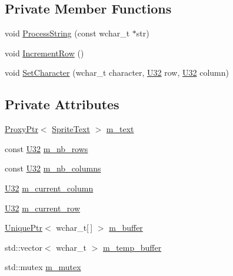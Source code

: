 \subsection*{Private Member Functions}
\begin{DoxyCompactItemize}
\item 
void \hyperlink{classmage_1_1script_1_1_text_console_script_a29334fd8aa8de09b2f28c24096347498}{Process\+String} (const wchar\+\_\+t $\ast$str)
\item 
void \hyperlink{classmage_1_1script_1_1_text_console_script_a3d4cba4fd8a2733933a7a444c6beaf1a}{Increment\+Row} ()
\item 
void \hyperlink{classmage_1_1script_1_1_text_console_script_a18bdee79ee6f53e28f90b607c36c8188}{Set\+Character} (wchar\+\_\+t character, \hyperlink{namespacemage_a41c104c036fba3756a74e19f793eeaa1}{U32} row, \hyperlink{namespacemage_a41c104c036fba3756a74e19f793eeaa1}{U32} column)
\end{DoxyCompactItemize}
\subsection*{Private Attributes}
\begin{DoxyCompactItemize}
\item 
\hyperlink{classmage_1_1_proxy_ptr}{Proxy\+Ptr}$<$ \hyperlink{classmage_1_1_sprite_text}{Sprite\+Text} $>$ \hyperlink{classmage_1_1script_1_1_text_console_script_a227a1a94f00552c267b7d3f3516676d6}{m\+\_\+text}
\item 
const \hyperlink{namespacemage_a41c104c036fba3756a74e19f793eeaa1}{U32} \hyperlink{classmage_1_1script_1_1_text_console_script_a9d00451cf1cf319512e0c88352d22911}{m\+\_\+nb\+\_\+rows}
\item 
const \hyperlink{namespacemage_a41c104c036fba3756a74e19f793eeaa1}{U32} \hyperlink{classmage_1_1script_1_1_text_console_script_a480c394aece0f517b9d10c4e912aadc9}{m\+\_\+nb\+\_\+columns}
\item 
\hyperlink{namespacemage_a41c104c036fba3756a74e19f793eeaa1}{U32} \hyperlink{classmage_1_1script_1_1_text_console_script_a10d396ae897b441a7cfc1f77c50eb16e}{m\+\_\+current\+\_\+column}
\item 
\hyperlink{namespacemage_a41c104c036fba3756a74e19f793eeaa1}{U32} \hyperlink{classmage_1_1script_1_1_text_console_script_abd3f8ee3c17545968fcf403ec9aef83d}{m\+\_\+current\+\_\+row}
\item 
\hyperlink{namespacemage_a3316d7143a973e37adf1110f2e80ca31}{Unique\+Ptr}$<$ wchar\+\_\+t\mbox{[}$\,$\mbox{]} $>$ \hyperlink{classmage_1_1script_1_1_text_console_script_a35db160ce89d4ebf6f184d2fe850beab}{m\+\_\+buffer}
\item 
std\+::vector$<$ wchar\+\_\+t $>$ \hyperlink{classmage_1_1script_1_1_text_console_script_ae62bf3d6f88f297eb37892d507d8a032}{m\+\_\+temp\+\_\+buffer}
\item 
std\+::mutex \hyperlink{classmage_1_1script_1_1_text_console_script_a1c7d7c3f45a22c8eb3956bca7ffba9b0}{m\+\_\+mutex}
\end{DoxyCompactItemize}
